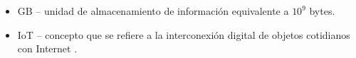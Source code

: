 \begin{acronym}
\end{acronym}

\begin{itemize}
  \item \ac{GB} -- unidad de almacenamiento de información equivalente a $10^9$ bytes.
  \item \ac{IoT} -- concepto que se refiere a la interconexión digital de objetos 
        cotidianos con Internet \cite{InternetCosas2021}.
\end{itemize}